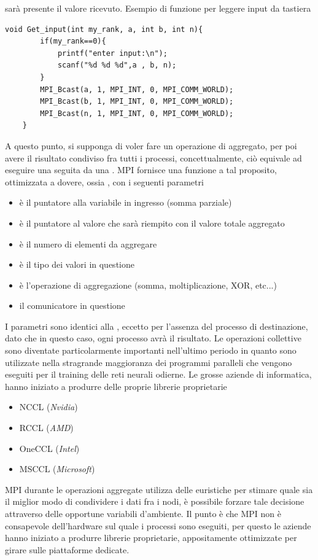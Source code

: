 \documentclass[10pt, letterpaper]{report}
\begin{document}
sarà presente il valore ricevuto.\acc 
Esempio di funzione per leggere input da tastiera 
\begin{lstlisting}[style=CStyle]
    void Get_input(int my_rank, a, int b, int n){
        if(my_rank==0){
            printf("enter input:\n");
            scanf("%d %d %d",a , b, n);
        }
        MPI_Bcast(a, 1, MPI_INT, 0, MPI_COMM_WORLD);
        MPI_Bcast(b, 1, MPI_INT, 0, MPI_COMM_WORLD);
        MPI_Bcast(n, 1, MPI_INT, 0, MPI_COMM_WORLD);
    }
\end{lstlisting}
A questo punto, si supponga di voler fare un operazione di aggregato, per poi avere il risultato condiviso fra tutti 
i processi, concettualmente, ciò equivale ad eseguire una  seguita da una . MPI 
fornisce una funzione a tal proposito, ottimizzata a dovere, ossia , con i seguenti parametri\begin{itemize}
    \item {} è il puntatore alla variabile in ingresso (somma parziale)
    \item {} è il puntatore al valore che sarà riempito con il valore totale aggregato
    \item {} è il numero di elementi da aggregare
    \item {} è il tipo dei valori in questione
    \item {} è l'operazione di aggregazione (somma, moltiplicazione, XOR, etc...) 
    \item {} il comunicatore in questione
\end{itemize}
I parametri sono identici alla ,  eccetto per l'assenza del processo di destinazione, dato che 
in questo caso, ogni processo avrà il risultato.\acc 
Le operazioni collettive sono diventate particolarmente importanti nell'ultimo periodo in quanto sono 
utilizzate nella stragrande maggioranza dei programmi paralleli che vengono eseguiti per il training delle 
reti neurali odierne. Le grosse aziende di informatica, hanno iniziato a produrre delle proprie librerie 
proprietarie\begin{itemize}
    \item NCCL (\textit{Nvidia})
    \item RCCL (\textit{AMD})
    \item OneCCL (\textit{Intel})
    \item MSCCL (\textit{Microsoft})
\end{itemize}
MPI durante le operazioni aggregate utilizza delle euristiche per stimare quale sia il miglior modo di condividere 
i dati fra i nodi, è possibile forzare tale decisione attraverso delle opportune variabili d'ambiente. Il punto è che MPI
non è consapevole dell'hardware sul quale i processi sono eseguiti, per questo le aziende hanno iniziato a 
produrre librerie proprietarie, appositamente ottimizzate per girare sulle piattaforme dedicate.
\end{document}
